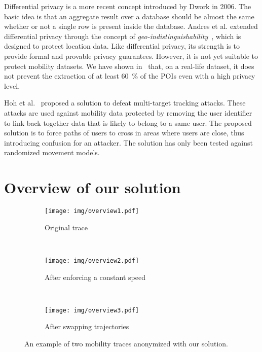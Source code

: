 \documentclass[10,conference,compsocconf]{IEEEtran}
\begin{document}
Differential privacy is a more recent concept introduced by Dwork in 2006.
The basic idea is that an aggregate result over a database should be almost the same whether or not a single row is present inside the database.
Andres et al. extended differential privacy through the concept of \textit{geo-indistinguishability}~\cite{Andres13}, which is designed to protect location data.
Like differential privacy, its strength is to provide formal and provable privacy guarantees.
However, it is not yet suitable to protect mobility datasets.
We have shown in~\cite{Mapomme14} that, on a real-life dataset, it does not prevent the extraction of at least 60~\% of the POIs even with a high privacy level.

Hoh et al.~\cite{Hoh05} proposed a solution to defeat multi-target tracking attacks.
These attacks are used against mobility data protected by removing the user identifier to link back together data that is likely to belong to a same user.
The proposed solution is to force paths of users to cross in areas where users are close, thus introducing confusion for an attacker.
The solution has only been tested against randomized movement models.

 \section{Overview of our solution}
\label{sec:solution}

\begin{figure*}
        \centering
        \begin{subfigure}[b]{0.3\textwidth}
                \texttt{[image: img/overview1.pdf]}
                \caption{Original trace}
                \label{fig:original}
        \end{subfigure}~ \begin{subfigure}[b]{0.3\textwidth}
                \texttt{[image: img/overview2.pdf]}
                \caption{After enforcing a constant speed}
                \label{fig:smoothing}
        \end{subfigure}
        ~ \begin{subfigure}[b]{0.3\textwidth}
                \texttt{[image: img/overview3.pdf]}
                \caption{After swapping trajectories}
                \label{fig:confusion}
        \end{subfigure}
        \caption{An example of two mobility traces anonymized with our solution.}\label{fig:overview}
\end{figure*}
\end{document}
